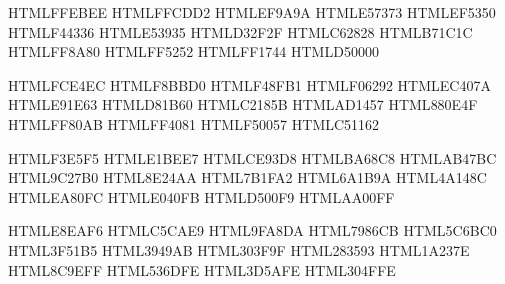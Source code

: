 \definecolor{Red-50}         {HTML}{FFEBEE}
\definecolor{Red-100}        {HTML}{FFCDD2}
\definecolor{Red-200}        {HTML}{EF9A9A}
\definecolor{Red-300}        {HTML}{E57373}
\definecolor{Red-400}        {HTML}{EF5350}
\definecolor{Red-500}        {HTML}{F44336}
\definecolor{Red-600}        {HTML}{E53935}
\definecolor{Red-700}        {HTML}{D32F2F}
\definecolor{Red-800}        {HTML}{C62828}
\definecolor{Red-900}        {HTML}{B71C1C}
\definecolor{Red-A100}       {HTML}{FF8A80}
\definecolor{Red-A200}       {HTML}{FF5252}
\definecolor{Red-A400}       {HTML}{FF1744}
\definecolor{Red-A700}       {HTML}{D50000}

\definecolor{Pink-50}        {HTML}{FCE4EC}
\definecolor{Pink-100}       {HTML}{F8BBD0}
\definecolor{Pink-200}       {HTML}{F48FB1}
\definecolor{Pink-300}       {HTML}{F06292}
\definecolor{Pink-400}       {HTML}{EC407A}
\definecolor{Pink-500}       {HTML}{E91E63}
\definecolor{Pink-600}       {HTML}{D81B60}
\definecolor{Pink-700}       {HTML}{C2185B}
\definecolor{Pink-800}       {HTML}{AD1457}
\definecolor{Pink-900}       {HTML}{880E4F}
\definecolor{Pink-A100}      {HTML}{FF80AB}
\definecolor{Pink-A200}      {HTML}{FF4081}
\definecolor{Pink-A400}      {HTML}{F50057}
\definecolor{Pink-A700}      {HTML}{C51162}

\definecolor{Purple-50}      {HTML}{F3E5F5}
\definecolor{Purple-100}     {HTML}{E1BEE7}
\definecolor{Purple-200}     {HTML}{CE93D8}
\definecolor{Purple-300}     {HTML}{BA68C8}
\definecolor{Purple-400}     {HTML}{AB47BC}
\definecolor{Purple-500}     {HTML}{9C27B0}
\definecolor{Purple-600}     {HTML}{8E24AA}
\definecolor{Purple-700}     {HTML}{7B1FA2}
\definecolor{Purple-800}     {HTML}{6A1B9A}
\definecolor{Purple-900}     {HTML}{4A148C}
\definecolor{Purple-A100}    {HTML}{EA80FC}
\definecolor{Purple-A200}    {HTML}{E040FB}
\definecolor{Purple-A400}    {HTML}{D500F9}
\definecolor{Purple-A700}    {HTML}{AA00FF}

\definecolor{Indigo-50}      {HTML}{E8EAF6}
\definecolor{Indigo-100}     {HTML}{C5CAE9}
\definecolor{Indigo-200}     {HTML}{9FA8DA}
\definecolor{Indigo-300}     {HTML}{7986CB}
\definecolor{Indigo-400}     {HTML}{5C6BC0}
\definecolor{Indigo-500}     {HTML}{3F51B5}
\definecolor{Indigo-600}     {HTML}{3949AB}
\definecolor{Indigo-700}     {HTML}{303F9F}
\definecolor{Indigo-800}     {HTML}{283593}
\definecolor{Indigo-900}     {HTML}{1A237E}
\definecolor{Indigo-A100}    {HTML}{8C9EFF}
\definecolor{Indigo-A200}    {HTML}{536DFE}
\definecolor{Indigo-A400}    {HTML}{3D5AFE}
\definecolor{Indigo-A700}    {HTML}{304FFE}

